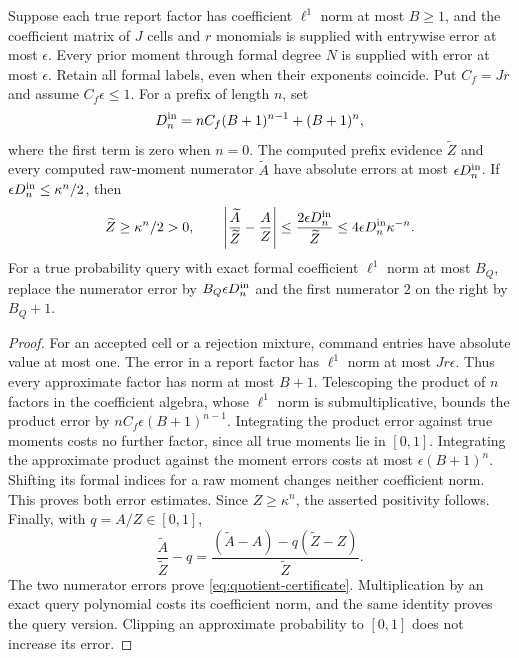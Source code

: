 \begin{lemma}
\label{lem:explicit-moment-certificate}
Suppose each true report factor has coefficient $\ell^1$ norm at most
$B\ge1$, and the coefficient matrix of $J$ cells and $r$ monomials
is supplied with entrywise error at most $\epsilon$. Every prior moment
through formal degree $N$ is supplied with error at most $\epsilon$.
Retain all formal labels, even when their exponents coincide. Put
$C_f=Jr$ and assume $C_f\epsilon\le1$. For a prefix of length $n$,
set
\[
 D_n^{\rm in}=nC_f(B+1)^{n-1}+(B+1)^n,
\]
where the first term is zero when $n=0$. The computed prefix evidence
$\widetilde Z$ and every computed raw-moment numerator
$\widetilde A$ have absolute errors at most
$\epsilon D_n^{\rm in}$. If
$\epsilon D_n^{\rm in}\le\kappa^n/2$, then
\begin{equation}\label{eq:quotient-certificate}
 \widetilde Z\ge\kappa^n/2>0,\qquad
 \left|\frac{\widetilde A}{\widetilde Z}-\frac A Z\right|
       \le\frac{2\epsilon D_n^{\rm in}}{\widetilde Z}
       \le4\epsilon D_n^{\rm in}\kappa^{-n}.
\end{equation}
For a true probability query with exact formal coefficient $\ell^1$
norm at most $B_Q$, replace the numerator error by
$B_Q\epsilon D_n^{\rm in}$ and the first numerator $2$ on the
right by $B_Q+1$.
\end{lemma}
\begin{proof}
For an accepted cell or a rejection mixture, command entries have
absolute value at most one. The error in a report factor has
$\ell^1$ norm at most $Jr\epsilon$. Thus every approximate factor
has norm at most $B+1$. Telescoping the product of $n$ factors in the
coefficient algebra, whose $\ell^1$ norm is submultiplicative, bounds
the product error by
$nC_f\epsilon(B+1)^{n-1}$. Integrating the product error against true
moments costs no further factor, since all true moments lie in $[0,1]$.
Integrating the approximate product against the moment errors costs at
most $\epsilon(B+1)^n$. Shifting its formal indices for a raw moment
changes neither coefficient norm. This proves both error estimates.
Since $Z\ge\kappa^n$, the asserted positivity follows. Finally,
with $q=A/Z\in[0,1]$,
\[
 \frac{\widetilde A}{\widetilde Z}-q
 =\frac{(\widetilde A-A)-q(\widetilde Z-Z)}{\widetilde Z}.
\]
The two numerator errors prove \eqref{eq:quotient-certificate}.
Multiplication by an exact query polynomial costs its coefficient norm,
and the same identity proves the query version. Clipping an approximate
probability to $[0,1]$ does not increase its error.
\end{proof}

